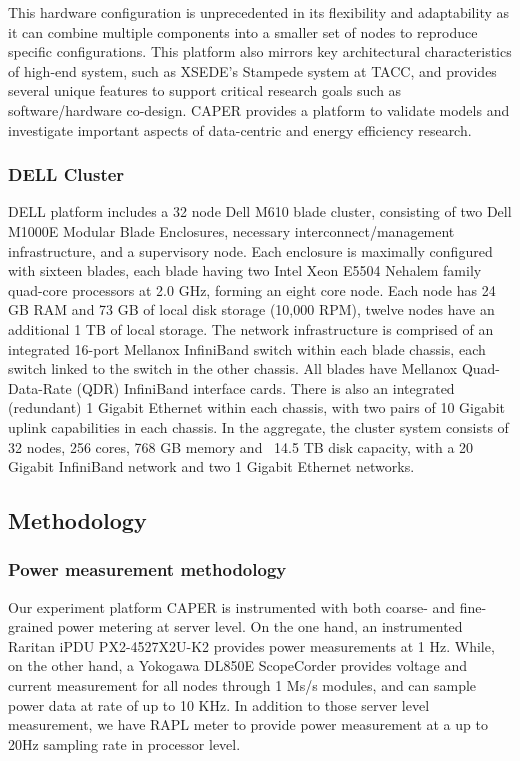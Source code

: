 \documentclass[10pt, conference, compsocconf]{IEEEtran}
\begin{document}
This hardware configuration is unprecedented in its flexibility and adaptability as it can combine multiple components into a smaller set of nodes to reproduce specific configurations. This platform also mirrors key architectural characteristics of high-end system, such as XSEDE's Stampede system at TACC, and provides several unique features to support critical research goals such as software/hardware co-design. CAPER provides a platform to validate models and investigate important aspects of data-centric and energy efficiency research.


\subsubsection{DELL Cluster}
DELL platform includes a 32 node Dell M610 blade cluster, consisting of two Dell M1000E Modular Blade Enclosures, necessary interconnect/management infrastructure, and a supervisory node. Each enclosure is maximally configured with sixteen blades, each blade having two Intel Xeon E5504 Nehalem family quad-core processors at 2.0 GHz, forming an eight core node. Each node has 24 GB RAM and 73 GB of local disk storage (10,000 RPM), twelve nodes have an additional 1 TB of local storage. The network infrastructure is comprised of an integrated 16-port Mellanox InfiniBand switch within each blade chassis, each switch linked to the switch in the other chassis. All blades have Mellanox Quad-Data-Rate (QDR) InfiniBand interface cards. There is also an integrated (redundant) 1 Gigabit Ethernet within each chassis, with two pairs of 10 Gigabit uplink capabilities in each chassis. In the aggregate, the cluster system consists of 32 nodes, 256 cores, 768 GB memory and ~14.5 TB disk capacity, with a 20 Gigabit InfiniBand network and two 1 Gigabit Ethernet networks.

\subsection{Methodology}
\subsubsection{Power measurement methodology}
Our experiment platform CAPER is instrumented with both coarse- and fine-grained power metering at server level. On the one hand, an instrumented Raritan iPDU PX2-4527X2U-K2 provides power measurements at 1 Hz. While, on the other hand, a Yokogawa DL850E ScopeCorder provides voltage and current measurement for all nodes through 1 Ms/s modules, and can sample power data at rate of up to 10 KHz. In addition to those server level measurement, we have RAPL meter to provide power measurement at a up to 20Hz sampling rate in processor level. 
\end{document}
